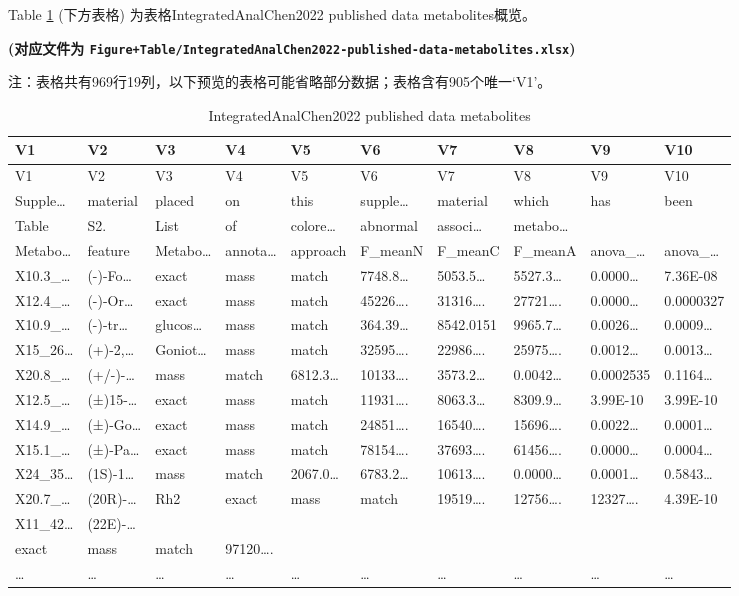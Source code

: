 \documentclass[
]{article}
\begin{document}
Table \ref{tab:IntegratedAnalChen2022-published-data-metabolites} (下方表格) 为表格IntegratedAnalChen2022 published data metabolites概览。

\textbf{(对应文件为 \texttt{Figure+Table/IntegratedAnalChen2022-published-data-metabolites.xlsx})}

\begin{center}\begin{tcolorbox}[colback=gray!10, colframe=gray!50, width=0.9\linewidth, arc=1mm, boxrule=0.5pt]注：表格共有969行19列，以下预览的表格可能省略部分数据；表格含有905个唯一`V1'。
\end{tcolorbox}
\end{center}

\begin{longtable}[]{@{}llllllllll@{}}
\caption{\label{tab:IntegratedAnalChen2022-published-data-metabolites}IntegratedAnalChen2022 published data metabolites}\tabularnewline
\toprule
V1 & V2 & V3 & V4 & V5 & V6 & V7 & V8 & V9 & V10\tabularnewline
\midrule
\endfirsthead
\toprule
V1 & V2 & V3 & V4 & V5 & V6 & V7 & V8 & V9 & V10\tabularnewline
\midrule
\endhead
Supple\ldots{} & material & placed & on & this & supple\ldots{} & material & which & has & been\tabularnewline
Table & S2. & List & of & colore\ldots{} & abnormal & associ\ldots{} & metabo\ldots{} & &\tabularnewline
Metabo\ldots{} & feature & Metabo\ldots{} & annota\ldots{} & approach & F\_meanN & F\_meanC & F\_meanA & anova\_\ldots{} & anova\_\ldots{}\tabularnewline
X10.3\_\ldots{} & (-)-Fo\ldots{} & exact & mass & match & 7748.8\ldots{} & 5053.5\ldots{} & 5527.3\ldots{} & 0.0000\ldots{} & 7.36E-08\tabularnewline
X12.4\_\ldots{} & (-)-Or\ldots{} & exact & mass & match & 45226\ldots. & 31316\ldots. & 27721\ldots. & 0.0000\ldots{} & 0.0000327\tabularnewline
X10.9\_\ldots{} & (-)-tr\ldots{} & glucos\ldots{} & mass & match & 364.39\ldots{} & 8542.0151 & 9965.7\ldots{} & 0.0026\ldots{} & 0.0009\ldots{}\tabularnewline
X15\_26\ldots{} & (+)-2,\ldots{} & Goniot\ldots{} & mass & match & 32595\ldots. & 22986\ldots. & 25975\ldots. & 0.0012\ldots{} & 0.0013\ldots{}\tabularnewline
X20.8\_\ldots{} & (+/-)-\ldots{} & mass & match & 6812.3\ldots{} & 10133\ldots. & 3573.2\ldots{} & 0.0042\ldots{} & 0.0002535 & 0.1164\ldots{}\tabularnewline
X12.5\_\ldots{} & (±)15-\ldots{} & exact & mass & match & 11931\ldots. & 8063.3\ldots{} & 8309.9\ldots{} & 3.99E-10 & 3.99E-10\tabularnewline
X14.9\_\ldots{} & (±)-Go\ldots{} & exact & mass & match & 24851\ldots. & 16540\ldots. & 15696\ldots. & 0.0022\ldots{} & 0.0001\ldots{}\tabularnewline
X15.1\_\ldots{} & (±)-Pa\ldots{} & exact & mass & match & 78154\ldots. & 37693\ldots. & 61456\ldots. & 0.0000\ldots{} & 0.0004\ldots{}\tabularnewline
X24\_35\ldots{} & (1S)-1\ldots{} & mass & match & 2067.0\ldots{} & 6783.2\ldots{} & 10613\ldots. & 0.0000\ldots{} & 0.0001\ldots{} & 0.5843\ldots{}\tabularnewline
X20.7\_\ldots{} & (20R)-\ldots{} & Rh2 & exact & mass & match & 19519\ldots. & 12756\ldots. & 12327\ldots. & 4.39E-10\tabularnewline
X11\_42\ldots{} & (22E)-\ldots{} & & & & & & & &\tabularnewline
exact & mass & match & 97120\ldots. & & & & & &\tabularnewline
\ldots{} & \ldots{} & \ldots{} & \ldots{} & \ldots{} & \ldots{} & \ldots{} & \ldots{} & \ldots{} & \ldots{}\tabularnewline
\bottomrule
\end{longtable}
\end{document}
